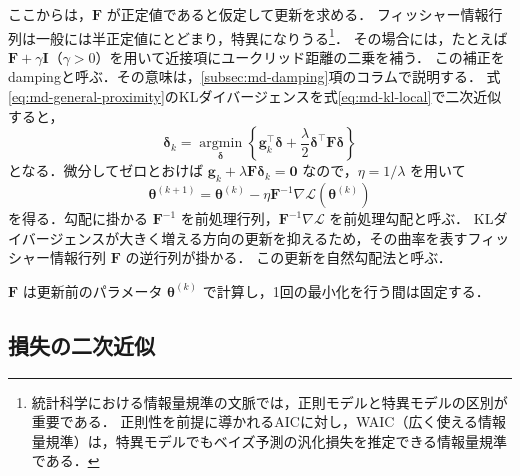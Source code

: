 \documentclass[../main.tex]{subfiles}
\begin{document}
ここからは，$\bm{F}$ が正定値であると仮定して更新を求める．
フィッシャー情報行列は一般には半正定値にとどまり，特異になりうる\footnote{統計科学における情報量規準の文脈では，正則モデルと特異モデルの区別が重要である．
正則性を前提に導かれるAICに対し，WAIC（広く使える情報量規準）は，特異モデルでもベイズ予測の汎化損失を推定できる情報量規準である\cite{watanabe2012bayes}．}．
その場合には，たとえば $\bm{F}+\gamma\bm{I}$（$\gamma>0$）を用いて近接項にユークリッド距離の二乗を補う．
この補正をdampingと呼ぶ．その意味は，\ref{subsec:md-damping}項のコラムで説明する．
式\eqref{eq:md-general-proximity}のKLダイバージェンスを式\eqref{eq:md-kl-local}で二次近似すると，
\begin{equation}
  \bm{\delta}_k=\underset{\bm{\delta}}{\operatorname{argmin}}
  \left\{\bm{g}_k^\top\bm{\delta}
  +\frac{\lambda}{2}\bm{\delta}^\top\bm{F}\bm{\delta}\right\}
  \label{eq:md-metric-model}
\end{equation}
となる．微分してゼロとおけば $\bm{g}_k+\lambda\bm{F}\bm{\delta}_k=\bm{0}$ なので，$\eta=1/\lambda$ を用いて
\begin{equation}
  \bm{\theta}^{(k+1)}=\bm{\theta}^{(k)}
  -\eta\bm{F}^{-1}\nabla\mathcal{L}(\bm{\theta}^{(k)})
  \label{eq:md-preconditioned-update}
\end{equation}
を得る．勾配に掛かる $\bm{F}^{-1}$ を前処理行列，$\bm{F}^{-1}\nabla\mathcal{L}$ を前処理勾配と呼ぶ．
KLダイバージェンスが大きく増える方向の更新を抑えるため，その曲率を表すフィッシャー情報行列 $\bm{F}$ の逆行列が掛かる．
この更新を自然勾配法と呼ぶ．

$\bm{F}$ は更新前のパラメータ $\bm{\theta}^{(k)}$ で計算し，1回の最小化を行う間は固定する．

\subsection{損失の二次近似}
\end{document}
